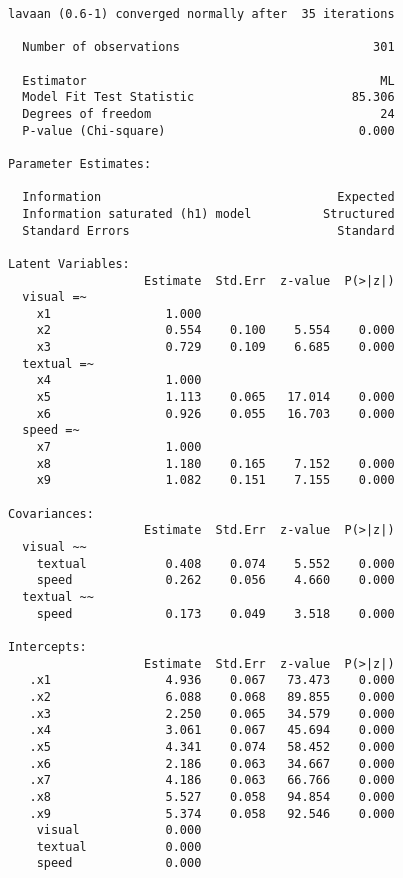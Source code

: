 \begin{verbatim}
lavaan (0.6-1) converged normally after  35 iterations

  Number of observations                           301

  Estimator                                         ML
  Model Fit Test Statistic                      85.306
  Degrees of freedom                                24
  P-value (Chi-square)                           0.000

Parameter Estimates:

  Information                                 Expected
  Information saturated (h1) model          Structured
  Standard Errors                             Standard

Latent Variables:
                   Estimate  Std.Err  z-value  P(>|z|)
  visual =~                                           
    x1                1.000                           
    x2                0.554    0.100    5.554    0.000
    x3                0.729    0.109    6.685    0.000
  textual =~                                          
    x4                1.000                           
    x5                1.113    0.065   17.014    0.000
    x6                0.926    0.055   16.703    0.000
  speed =~                                            
    x7                1.000                           
    x8                1.180    0.165    7.152    0.000
    x9                1.082    0.151    7.155    0.000

Covariances:
                   Estimate  Std.Err  z-value  P(>|z|)
  visual ~~                                           
    textual           0.408    0.074    5.552    0.000
    speed             0.262    0.056    4.660    0.000
  textual ~~                                          
    speed             0.173    0.049    3.518    0.000

Intercepts:
                   Estimate  Std.Err  z-value  P(>|z|)
   .x1                4.936    0.067   73.473    0.000
   .x2                6.088    0.068   89.855    0.000
   .x3                2.250    0.065   34.579    0.000
   .x4                3.061    0.067   45.694    0.000
   .x5                4.341    0.074   58.452    0.000
   .x6                2.186    0.063   34.667    0.000
   .x7                4.186    0.063   66.766    0.000
   .x8                5.527    0.058   94.854    0.000
   .x9                5.374    0.058   92.546    0.000
    visual            0.000                           
    textual           0.000                           
    speed             0.000                           


\end{verbatim}
